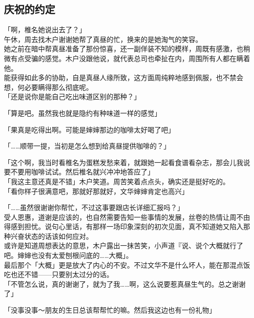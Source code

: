 \subsection{庆祝的约定}

「啊，椎名她说出去了？」\\

午休，周去找木户谢谢她帮了真昼的忙，换来的是她淘气的笑容。\\

她之前在暗中帮真昼准备了那份惊喜，还一副佯装不知的模样，周既有感激，也稍微有点受骗的感觉。木户没跟他说，就代表总司也牵扯在内，周围所有人都在瞒着他。\\

能获得如此多的协助，自是真昼人缘所致，这方面周纯粹地感到佩服，也不禁会想，何必要瞒得那么彻底呢。\\

「还是说你是能自己吃出味道区别的那种？」

「算是吧。虽然我也就是隐约有种味道一样的感觉」

「果真是吃得出啊。可能是婶婶那边的咖啡太好喝了吧」

「……顺带一提，当初是怎么想到给真昼提供咖啡的？」

「这个啊，我当时看椎名为蛋糕发愁来着，就跟她一起看食谱看杂志，那会儿我说要不要用咖啡试试。然后椎名就兴冲冲地答应了」\\

「我这主意还真是不错」木户笑道。周苦笑着点点头，确实还是挺好吃的。\\

「看你样子很满意吧，那就好那就好，文华婶婶肯定也高兴」

「……虽然很谢谢你帮忙，不过这事要跟店长详细汇报吗？」\\

受人恩惠，道谢是应该的，也自然需要告知一些事情的发展，丝卷的热情让周不由得感到担忧。说句心里话，有那样一场印象深刻的初次见面，真不知道她又陷入那种兴奋状态的话该如何应对。\\

或许是知道周想表达的意思，木户露出一抹苦笑，小声道『说、说个大概就行了吧。婶婶也没有太爱刨根问底的……大概」。\\

最后那个「大概」更是放大了内心的不安。不过文华不是什么坏人，能在那混点饭吃也还不错——只要别太过分的话。\\

「不管怎么说，真的谢谢了，就为了我……啊，这么说要惹真昼生气的。总之谢谢了」

「没事没事～朋友的生日总该帮帮忙的嘛。然后我这边也有一份礼物」\\

